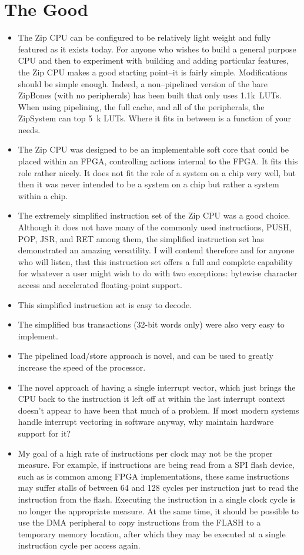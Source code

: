 \documentclass{gqtekspec}
\begin{document}
\section{The Good}
\begin{itemize}
\item The Zip CPU can be configured to be relatively light weight and fully
	featured as it exists today. For anyone who wishes to build a general
	purpose CPU and then to experiment with building and adding particular
	features, the Zip CPU makes a good starting point--it is fairly simple.
	Modifications should be simple enough.  Indeed, a non--pipelined
	version of the bare ZipBones (with no peripherals) has been built that
	only uses 1.1k~LUTs.  When using pipelining, the full cache, and all
	of the peripherals, the ZipSystem can top 5~k LUTs.  Where it fits
	in between is a function of your needs.
\item The Zip CPU was designed to be an implementable soft core that could be
	placed within an FPGA, controlling actions internal to the FPGA. It
	fits this role rather nicely. It does not fit the role of a system on
	a chip very well, but then it was never intended to be a system on a
	chip but rather a system within a chip.
\item The extremely simplified instruction set of the Zip CPU was a good
	choice. Although it does not have many of the commonly used
	instructions, PUSH, POP, JSR, and RET among them, the simplified
	instruction set has demonstrated an amazing versatility. I will contend
	therefore and for anyone who will listen, that this instruction set
	offers a full and complete capability for whatever a user might wish
	to do with two exceptions: bytewise character access and accelerated
	floating-point support.
\item This simplified instruction set is easy to decode.
\item The simplified bus transactions (32-bit words only) were also very easy
	to implement.
\item The pipelined load/store approach is novel, and can be used to greatly
	increase the speed of the processor.
\item The novel approach of having a single interrupt vector, which just
	brings the CPU back to the instruction it left off at within the last
	interrupt context doesn't appear to have been that much of a problem.
	If most modern systems handle interrupt vectoring in software anyway,
	why maintain hardware support for it?
\item My goal of a high rate of instructions per clock may not be the proper
	measure. For example, if instructions are being read from a SPI flash
	device, such as is common among FPGA implementations, these same
	instructions may suffer stalls of between 64 and 128 cycles per
	instruction just to read the instruction from the flash. Executing the
	instruction in a single clock cycle is no longer the appropriate
	measure. At the same time, it should be possible to use the DMA
	peripheral to copy instructions from the FLASH to a temporary memory
	location, after which they may be executed at a single instruction
	cycle per access again. 
\end{itemize}
\end{document}
